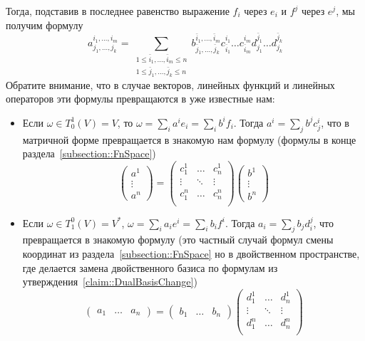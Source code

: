 Тогда, подставив в последнее равенство выражение $f_i$ через $e_i$ и $f^j$ через $e^j$, мы получим формулу
\[
a^{i_1,\ldots,i_m}_{j_1,\ldots,j_k} = \sum_{\substack{1\leqslant \bar i_1,\ldots,\bar i_m\leqslant n\\1\leqslant \bar j_1,\ldots,\bar j_k\leqslant n}} b^{\bar i_1,\ldots,\bar i_m}_{\bar j_1,\ldots,\bar j_k} c^{i_1}_{\bar i_1}\ldots c^{i_m}_{\bar i_m} d^{\bar j_1}_{j_1}\ldots d^{\bar j_k}_{j_k}
\]
Обратите внимание, что в случае векторов, линейных функций и линейных операторов эти формулы превращаются в уже известные нам:
\begin{itemize}
\item Если $\omega\in T^1_0(V) = V$, то $\omega = \sum_i a^i e_i = \sum_i b^i f_i$.
Тогда $a^i = \sum_j b^j c^i_j$, что в матричной форме превращается в знакомую нам формулу (формулы в конце раздела~\ref{subsection::FnSpace})
\[
\begin{pmatrix}
{a^1}\\{\vdots}\\{a^n}
\end{pmatrix}
=
\begin{pmatrix}
{c^1_1}&{\ldots}&{c^1_n}\\
{\vdots}&{\ddots}&{\vdots}\\
{c^n_1}&{\ldots}&{c^n_n}\\
\end{pmatrix}
\begin{pmatrix}
{b^1}\\{\vdots}\\{b^n}
\end{pmatrix}
\]

\item Если $\omega\in T^0_1(V) = V^*$, $\omega = \sum_i a_i e^i = \sum_i b_i f^i$.
Тогда $a_i = \sum_j b_j d^j_i$, что превращается в знакомую формулу (это частный случай формул смены координат из раздела~\ref{subsection::FnSpace} но в двойственном пространстве, где делается замена двойственного базиса по формулам из утверждения~\ref{claim::DualBasisChange})
\[
\begin{pmatrix}
{a_1}&{\ldots}&{a_n}
\end{pmatrix}
=
\begin{pmatrix}
{b_1}&{\ldots}&{b_n}
\end{pmatrix}
\begin{pmatrix}
{d^1_1}&{\ldots}&{d^1_n}\\
{\vdots}&{\ddots}&{\vdots}\\
{d^n_1}&{\ldots}&{d^n_n}\\
\end{pmatrix}
\]


\end{itemize}
